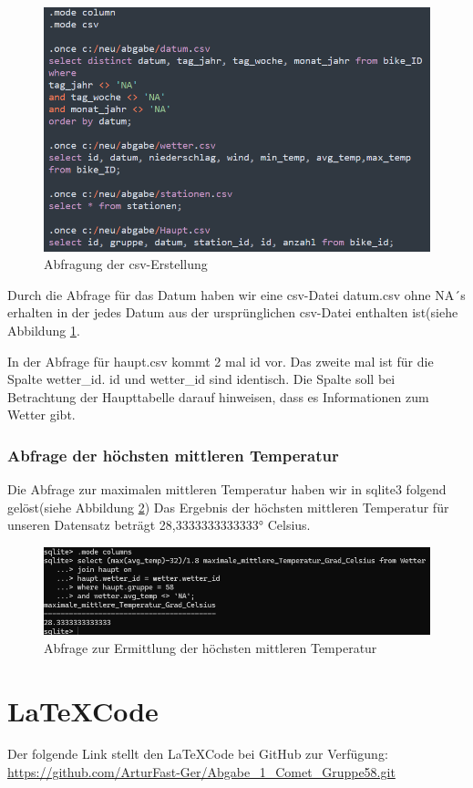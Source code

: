\documentclass{article}
\begin{document}
\begin{figure}[!]
    \centering
    \includegraphics[width= \textwidth]{Abbildung_5.png}
    \caption{Abfragung der csv-Erstellung}
    \label{fig:Abb5}
\end{figure}
\newpage
Durch die Abfrage für das Datum haben wir eine csv-Datei \glqq datum.csv\grqq{} ohne \glqq NA´s\grqq{} erhalten in der jedes Datum aus der ursprünglichen csv-Datei enthalten ist(siehe Abbildung \ref{fig:Abb5}.

In der Abfrage für haupt.csv kommt 2 mal \glqq id\grqq{} vor. Das zweite mal ist für die Spalte \glqq wetter\_id\grqq{}. \glqq id\grqq{} und \glqq wetter\_id\grqq{} sind identisch. Die Spalte soll bei Betrachtung der Haupttabelle darauf hinweisen, dass es Informationen zum Wetter gibt. 

\subsubsection{Abfrage der höchsten mittleren Temperatur}

Die Abfrage zur maximalen mittleren Temperatur haben wir in sqlite3 folgend gelöst(siehe Abbildung \ref{fig:Abb6}) Das Ergebnis der höchsten mittleren Temperatur für unseren Datensatz beträgt \ang{28,3333333333333} Celsius.
\begin{figure}[ht]
    \centering
    \includegraphics[width= \textwidth]{Abbildung_6.png}
    \caption{Abfrage zur Ermittlung der höchsten mittleren Temperatur}
    \label{fig:Abb6}
\end{figure}

\section{\LaTeX Code}
Der folgende Link stellt den \LaTeX Code bei GitHub zur Verfügung: \url{https://github.com/ArturFast-Ger/Abgabe_1_Comet_Gruppe58.git}




\end{document}
